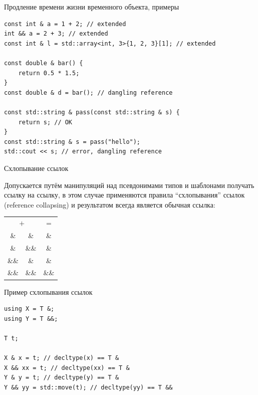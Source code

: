\documentclass[unknownkeysallowed,xcolor=table]{beamer}
\begin{document}
\begin{frame}[fragile]{Продление времени жизни временного объекта, примеры}

\begin{lstlisting}
const int & a = 1 + 2; // extended
int && a = 2 + 3; // extended
const int & l = std::array<int, 3>{1, 2, 3}[1]; // extended

const double & bar() {
    return 0.5 * 1.5;
}
const double & d = bar(); // dangling reference

const std::string & pass(const std::string & s) {
    return s; // OK
}
const std::string & s = pass("hello");
std::cout << s; // error, dangling reference
\end{lstlisting}

\end{frame}

\begin{frame}{Схлопывание ссылок}

Допускается путём манипуляций над псевдонимами типов и шаблонами получать ссылку на ссылку, в этом случае применяются правила ``схлопывания'' ссылок (reference collapsing) и результатом всегда является обычная ссылка:

\vspace{2em}

\begin{center}
\begin{tabular}{ c c | c }
  \hline
    \multicolumn{2}{c|}{$+$} & $=$ \\
     \& & \& & \& \\
     \& & \&\& & \& \\
     \&\& & \& & \& \\
     \&\& & \&\& & \&\& \\
\end{tabular}
\end{center}

\end{frame}

\begin{frame}[fragile]{Пример схлопывания ссылок}

\begin{lstlisting}
using X = T &;
using Y = T &&;

T t;

X & x = t; // decltype(x) == T &
X && xx = t; // decltype(xx) == T &
Y & y = t; // decltype(y) == T &
Y && yy = std::move(t); // decltype(yy) == T &&
\end{lstlisting}

\end{frame}
\end{document}
